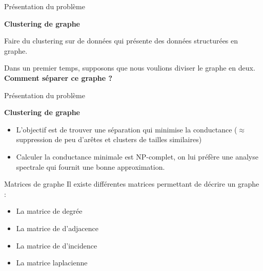\begin{frame}{Présentation du problème}
    \begin{minipage}{0.49\linewidth}
        \textbf{Clustering de graphe}

        Faire du clustering sur de données qui présente des données structurées en graphe.

        Dans un premier temps, supposons que nous voulions diviser le graphe en deux.
        \\

        \alert{\textbf{Comment séparer ce graphe ?}}
    \end{minipage}
    \begin{minipage}{0.49\linewidth}
    \end{minipage}
\end{frame}
\begin{frame}{Présentation du problème}
    \begin{minipage}{0.49\linewidth}
        \textbf{Clustering de graphe}
        \begin{itemize}
            \item L'objectif est de trouver une séparation qui minimise la conductance ($\approx$ suppression de peu d'arêtes et clusters de tailles similaires)
            \item Calculer la conductance minimale est NP-complet, on lui préfère une analyse spectrale qui fournit une bonne approximation.
    \end{itemize}
        
    \end{minipage}
    \begin{minipage}{0.49\linewidth}
    \end{minipage}
\end{frame}

\begin{frame}{Matrices de graphe}
    Il existe différentes matrices permettant de décrire un graphe :
    \begin{itemize}
        \item La matrice de degrée
        \item La matrice de d'adjacence
        \item La matrice de d'incidence
        \item La matrice laplacienne
    \end{itemize}
\end{frame}

